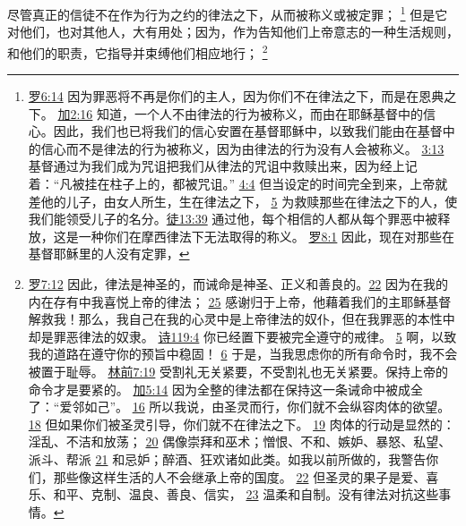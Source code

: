 \documentclass[12pt, a4paper, oneside]{ctexart}
\newcounter{parnum}[section]
\newcommand{\N}{%
   \noindent\refstepcounter{parnum}%
    \makebox[\parindent][l]{\textbf{\arabic{parnum}.}}}
\begin{document}
\N 尽管真正的信徒不在作为行为之约的律法之下，从而被称义或被定罪；
	\footnote {
		\href{https://biblehub.com/romans/6-14.htm}{罗6:14} 因为罪恶将不再是你们的主人，因为你们不在律法之下，而是在恩典之下。
		\href{https://biblehub.com/galatians/2-16.htm}{加2:16} 知道，一个人不由律法的行为被称义，而由在耶稣基督中的信心。因此，我们也已将我们的信心安置在基督耶稣中，以致我们能由在基督中的信心而不是律法的行为被称义，因为由律法的行为没有人会被称义。
		\href{https://biblehub.com/galatians/3-13.htm}{3:13} 基督通过为我们成为咒诅把我们从律法的咒诅中救赎出来，因为经上记着：“凡被挂在柱子上的，都被咒诅。”
		\href{https://biblehub.com/galatians/4-4.htm}{4:4} 但当设定的时间完全到来，上帝就差他的儿子，由女人所生，生在律法之下，
		\href{https://biblehub.com/galatians/4-5.htm}{5} 为救赎那些在律法之下的人，使我们能领受儿子的名分。\href{https://biblehub.com/acts/13-39.htm}{徒13:39} 通过他，每个相信的人都从每个罪恶中被释放，这是一种你们在摩西律法下无法取得的称义。
		\href{https://biblehub.com/romans/8-1.htm}{罗8:1} 因此，现在对那些在基督耶稣里的人没有定罪，
	}
	但是它对他们，也对其他人，大有用处；因为，作为告知他们上帝意志的一种生活规则，和他们的职责，它指导并束缚他们相应地行；
	\footnote {
		\href{https://biblehub.com/romans/7-12.htm}{罗7:12} 因此，律法是神圣的，而诫命是神圣、正义和善良的。\href{https://biblehub.com/romans/7-22.htm}{22} 因为在我的内在存有中我喜悦上帝的律法；
		\href{https://biblehub.com/romans/7-25.htm}{25} 感谢归于上帝，他藉着我们的主耶稣基督解救我！那么，我自己在我的心灵中是上帝律法的奴仆，但在我罪恶的本性中却是罪恶律法的奴隶。
		\href{https://biblehub.com/psalms/119-4.htm}{诗119:4} 你已经置下要被完全遵守的戒律。
		\href{https://biblehub.com/psalms/119-5.htm}{5} 啊，以致我的道路在遵守你的预旨中稳固！
		\href{https://biblehub.com/psalms/119-6.htm}{6} 于是，当我思虑你的所有命令时，我不会被置于耻辱。
		\href{https://biblehub.com/1_corinthians/7-19.htm}{林前7:19} 受割礼无关紧要，不受割礼也无关紧要。保持上帝的命令才是要紧的。
		\href{https://biblehub.com/galatians/5-14.htm}{加5:14} 因为全整的律法都在保持这一条诫命中被成全了：“爱邻如己”。
		\href{https://biblehub.com/galatians/5-16.htm}{16} 所以我说，由圣灵而行，你们就不会纵容肉体的欲望。
		\href{https://biblehub.com/galatians/5-18.htm}{18} 但如果你们被圣灵引导，你们就不在律法之下。
		\href{https://biblehub.com/galatians/5-19.htm}{19} 肉体的行动是显然的：淫乱、不洁和放荡；
		\href{https://biblehub.com/galatians/5-20.htm}{20} 偶像崇拜和巫术；憎恨、不和、嫉妒、暴怒、私望、派斗、帮派
		\href{https://biblehub.com/galatians/5-21.htm}{21} 和忌妒；醉酒、狂欢诸如此类。如我以前所做的，我警告你们，那些像这样生活的人不会继承上帝的国度。
		\href{https://biblehub.com/galatians/5-22.htm}{22} 但圣灵的果子是爱、喜乐、和平、克制、温良、善良、信实，
		\href{https://biblehub.com/galatians/5-23.htm}{23} 温柔和自制。没有律法对抗这些事情。
	}
\end{document}
